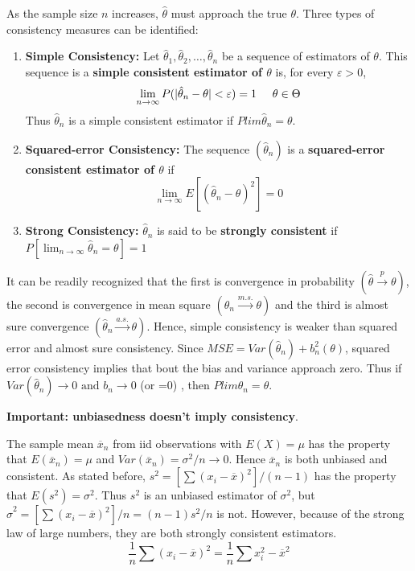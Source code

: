 \documentclass{article}
\begin{document}
As the sample size \(n\) increases, \(\hat{\theta}\) must approach the true \(\theta\). Three types of consistency measures can be identified:
\begin{enumerate}
    \item \textbf{Simple Consistency:} Let \(\hat{\theta}_1,\hat{\theta}_2,\dots,\hat{\theta}_n\) be a sequence of estimators of \(\theta\). This sequence is a \textbf{simple consistent estimator of \(\theta\)} is, for every \(\varepsilon>0\),
    \begin{equation*}
        \lim_{n \rightarrow \infty} P(|\hat{\theta}_n-\theta|<\varepsilon)=1 \hspace{0.5cm} \theta \in \Theta
    \end{equation*}
    Thus \(\hat{\theta}_n\) is a simple consistent estimator if \(Plim \hat{\theta}_n=\theta\).
    \item \textbf{Squared-error Consistency:} The sequence \((\hat{\theta}_n)\) is a \textbf{squared-error consistent estimator of \(\theta\)} if \begin{equation*}
        \lim_{n \rightarrow \infty} E[(\hat{\theta}_n-\theta)^2]=0
    \end{equation*}
    \item \textbf{Strong Consistency:} \(\hat{\theta}_n\) is said to be \textbf{strongly consistent} if \(P\left[\lim_{n \rightarrow \infty} \hat{\theta}_n=\theta \right]=1\)
\end{enumerate}

It can be readily recognized that the first is convergence in probability \((\hat{\theta} \stackrel{p} \longrightarrow \theta)\), the second is convergence in mean square \((\hat{\theta}_n \stackrel{m.s.} \longrightarrow \theta)\) and the third is almost sure convergence \((\hat{\theta}_n \stackrel{a.s.} \longrightarrow \theta)\). Hence, simple consistency is weaker than squared error and almost sure consistency. Since \(MSE=Var(\hat{\theta}_n)+b^2_n(\theta)\), squared error consistency implies that bout the bias and variance approach zero. Thus if \(Var(\hat{\theta}_n) \rightarrow 0 \text{ and } b_n \rightarrow 0\)  (or =0)
, then \(Plim \hat{\theta}_n=\theta\).

\textbf{Important: unbiasedness doesn't imply consistency}.

The sample mean \(\overline{x}_n\) from iid observations with \(E(X)=\mu\) has the property that \(E(\overline{x}_n)=\mu\) and \(Var(\overline{x}_n)=\sigma^2/n \rightarrow 0\). Hence \(\overline{x}_n\) is both unbiased and consistent. As stated before, \(s^2=[\sum (x_i-\overline{x})^2]/(n-1)\) has the property that \(E(s^2)=\sigma^2\). Thus \(s^2\) is an unbiased estimator of \(\sigma^2\), but \(\hat{\sigma}^2=[\sum(x_i-\overline{x})^2]/n=(n-1)s^2/n\) is not. However, because of the strong law of large numbers, they are both strongly consistent estimators.
\begin{equation*}
    \frac{1}{n}\sum(x_i-\overline{x})^2=\frac{1}{n} \sum x_i^2-\overline{x}^2
\end{equation*}
\end{document}
